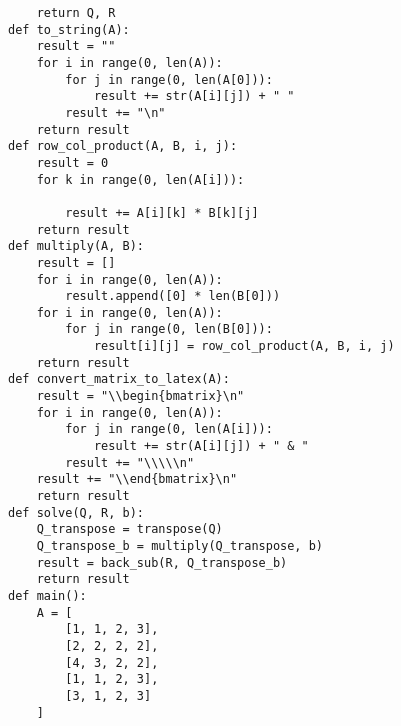 \documentclass{article}
\begin{document}
\begin{enumerate}
\begin{lstlisting}
    return Q, R
def to_string(A):
    result = ""
    for i in range(0, len(A)):
        for j in range(0, len(A[0])):
            result += str(A[i][j]) + " "
        result += "\n"
    return result
def row_col_product(A, B, i, j):
    result = 0
    for k in range(0, len(A[i])):
        
        result += A[i][k] * B[k][j]
    return result
def multiply(A, B):
    result = []
    for i in range(0, len(A)):
        result.append([0] * len(B[0]))
    for i in range(0, len(A)):
        for j in range(0, len(B[0])):
            result[i][j] = row_col_product(A, B, i, j)
    return result
def convert_matrix_to_latex(A):
    result = "\\begin{bmatrix}\n"
    for i in range(0, len(A)):
        for j in range(0, len(A[i])):
            result += str(A[i][j]) + " & "
        result += "\\\\\n"
    result += "\\end{bmatrix}\n"
    return result
def solve(Q, R, b):
    Q_transpose = transpose(Q)
    Q_transpose_b = multiply(Q_transpose, b)
    result = back_sub(R, Q_transpose_b)
    return result
def main():
    A = [
        [1, 1, 2, 3],
        [2, 2, 2, 2], 
        [4, 3, 2, 2],
        [1, 1, 2, 3],
        [3, 1, 2, 3]
    ]
    

\end{lstlisting}
\end{enumerate}
\end{document}
